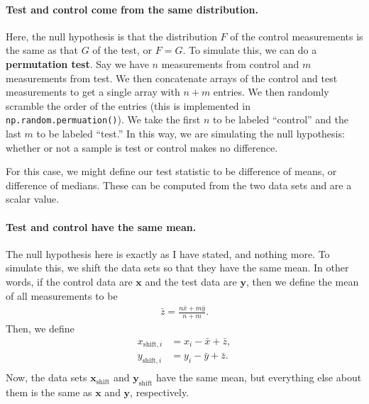 \paragraph{Test and control come from the same distribution.} Here, the null hypothesis is that the distribution $F$ of the control measurements is the same as that $G$ of the test, or $F = G$. To simulate this, we can do a \textbf{permutation test}. Say we have $n$ measurements from control and $m$ measurements from test. We then concatenate arrays of the control and test measurements to get a single array with $n + m$ entries. We then randomly scramble the order of the entries (this is implemented in \texttt{np.random.permuation()}). We take the first $n$ to be labeled ``control'' and the last $m$ to be labeled ``test.'' In this way, we are simulating the null hypothesis: whether or not a sample is test or control makes no difference.

For this case, we might define our test statistic to be difference of means, or difference of medians. These can be computed from the two data sets and are a scalar value.

\paragraph{Test and control have the same mean.} The null hypothesis here is exactly as I have stated, and nothing more. To simulate this, we shift the data sets so that they have the same mean. In other words, if the control data are $\mathbf{x}$ and the test data are $\mathbf{y}$, then we define the mean of all measurements to be
\begin{align}
    \bar{z} = \frac{n\bar{x} + m\bar{y}}{n+m}.
\end{align}
Then, we define
\begin{align}
    x_{\mathrm{shift}, i} &= x_i - \bar{x} + \bar{z}, \\
    y_{\mathrm{shift}, i} &= y_i - \bar{y} + \bar{z}. \\
\end{align}
Now, the data sets $\mathbf{x}_\mathrm{shift}$ and $\mathbf{y}_\mathrm{shift}$ have the same mean, but everything else about them is the same as $\mathbf{x}$ and $\mathbf{y}$, respectively.
